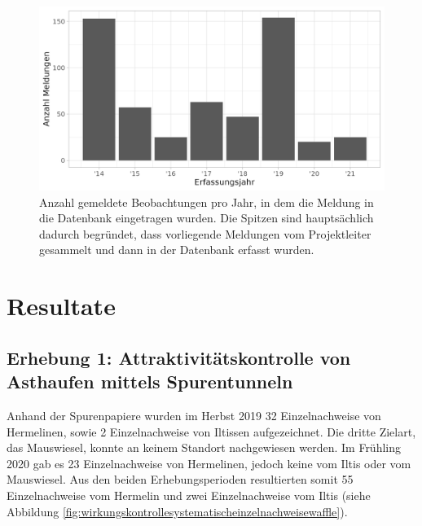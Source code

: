 \documentclass[
  oneside]{scrbook}
\begin{document}
\begin{figure}
\includegraphics[width=1\linewidth]{images/beobachtungsmeldungen_histogramm} \caption{Anzahl gemeldete Beobachtungen pro Jahr, in dem die Meldung in die Datenbank eingetragen wurden. Die Spitzen sind hauptsächlich dadurch begründet, dass vorliegende Meldungen vom Projektleiter gesammelt und dann in der Datenbank erfasst wurden.}\label{fig:beobachtungsmeldungenhistogramm}
\end{figure}

\hypertarget{resultate}{%
\chapter{Resultate}\label{resultate}}

\hypertarget{erhebung-1-attraktivituxe4tskontrolle-von-asthaufen-mittels-spurentunneln-1}{%
\section{Erhebung 1: Attraktivitätskontrolle von Asthaufen mittels Spurentunneln}\label{erhebung-1-attraktivituxe4tskontrolle-von-asthaufen-mittels-spurentunneln-1}}

Anhand der Spurenpapiere wurden im Herbst 2019 32 Einzelnachweise von Hermelinen, sowie 2 Einzelnachweise von Iltissen aufgezeichnet. Die dritte Zielart, das Mauswiesel, konnte an keinem Standort nachgewiesen werden. Im Frühling 2020 gab es 23 Einzelnachweise von Hermelinen, jedoch keine vom Iltis oder vom Mauswiesel. Aus den beiden Erhebungsperioden resultierten somit 55 Einzelnachweise vom Hermelin und zwei Einzelnachweise vom Iltis (siehe Abbildung \ref{fig:wirkungskontrollesystematischeinzelnachweisewaffle}).
\end{document}
